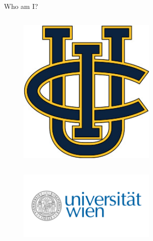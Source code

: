 \begin{frame}{Who am I?}
\begin{columns}
\begin{column}[T]{0.3\textwidth}
\begin{columns}
\begin{column}[T, onlytextwidth]{0.5\textwidth}
        \begin{figure}
          \includegraphics[width=0.6\textwidth]{
            slides/assets/who-am-i-uci.jpg
          }
        \end{figure}

      \end{column}

    \end{columns}

    \begin{figure}
      \includegraphics[width=0.6\textwidth]{
        slides/assets/who-am-i-university-vienna.jpg
      }
    \end{figure}
  
  \end{column}

\end{columns}

\end{frame}
